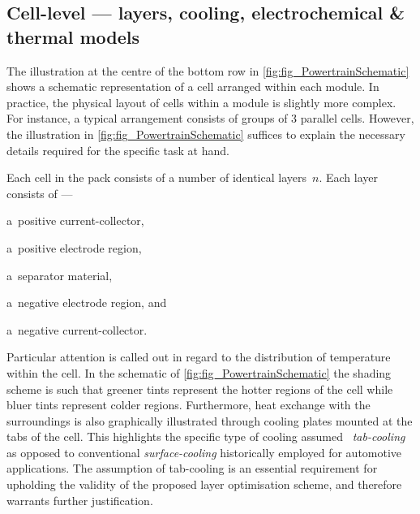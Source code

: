 
\subsection{Cell-level --- layers, cooling, electrochemical \& thermal models}\label{sec:celllevelxeVinfo}

The    illustration    at     the    centre    of    the     bottom    row    in
\cref{fig:fig_PowertrainSchematic} shows  a schematic  representation of  a cell
arranged within  each module. In practice,  the physical layout of  cells within
a  module  is  slightly  more  complex.  For  instance,  a  typical  arrangement
consists  of  groups   of  3  parallel  cells.  However,   the  illustration  in
\cref{fig:fig_PowertrainSchematic}  suffices to  explain  the necessary  details
required for the specific task at hand.

Each cell in the pack consists of a number of identical layers~$n$. Each layer
consists of ---
\begin{enumerate*}[label=\roman*)]
    \item a~positive current-collector,
    \item a~positive electrode region,
    \item a~separator material,
    \item a~negative electrode region, and
    \item a~negative current-collector.
\end{enumerate*}
Particular attention is called out in  regard to the distribution of temperature
within  the cell.  In  the schematic  of \cref{fig:fig_PowertrainSchematic}  the
shading scheme  is such that greener  tints represent the hotter  regions of the
cell while bluer tints represent colder regions. Furthermore, heat exchange with
the surroundings is also graphically  illustrated through cooling plates mounted
at the tabs  of the cell. This  highlights the specific type  of cooling assumed
\viz~\emph{tab-cooling}  as  opposed to  conventional  \emph{surface-cooling}
historically employed for automotive applications. The assumption of tab-cooling
is an  essential requirement for  upholding the  validity of the  proposed layer
optimisation scheme, and therefore warrants further justification.

